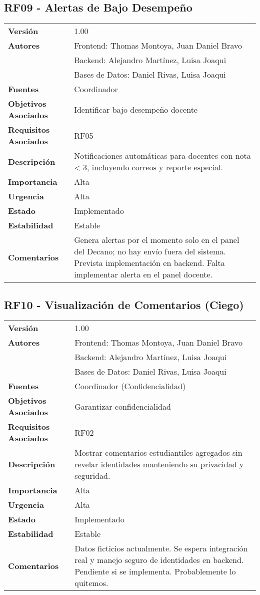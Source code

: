 \documentclass{article}
\begin{document}
\subsection*{RF09 - Alertas de Bajo Desempeño}
\begin{longtable}{>{\bfseries}l p{}}
Versión & 1.00 \\
Autores & Frontend: Thomas Montoya, Juan Daniel Bravo \\ 
        & Backend: Alejandro Martínez, Luisa Joaqui \\ 
        & Bases de Datos: Daniel Rivas, Luisa Joaqui \\
Fuentes & Coordinador \\
Objetivos Asociados & Identificar bajo desempeño docente \\
Requisitos Asociados & RF05 \\
Descripción & Notificaciones automáticas para docentes con nota < 3, incluyendo correos y reporte especial. \\
Importancia & Alta \\
Urgencia & Alta \\
Estado & Implementado \\
Estabilidad & Estable \\
Comentarios & Genera alertas por el momento solo en el panel del Decano; no hay envío fuera del sistema. Prevista implementación en backend. Falta implementar alerta en el panel docente. \\
\end{longtable}

\subsection*{RF10 - Visualización de Comentarios (Ciego)}
\begin{longtable}{>{\bfseries}l p{}}
Versión & 1.00 \\
Autores & Frontend: Thomas Montoya, Juan Daniel Bravo \\ 
        & Backend: Alejandro Martínez, Luisa Joaqui \\ 
        & Bases de Datos: Daniel Rivas, Luisa Joaqui \\
Fuentes & Coordinador (Confidencialidad) \\
Objetivos Asociados & Garantizar confidencialidad \\
Requisitos Asociados & RF02 \\
Descripción & Mostrar comentarios estudiantiles agregados sin revelar identidades manteniendo su privacidad y seguridad. \\
Importancia & Alta \\
Urgencia & Alta \\
Estado & Implementado \\
Estabilidad & Estable \\
Comentarios & Datos ficticios actualmente. Se espera integración real y manejo seguro de identidades en backend. Pendiente si se implementa. Probablemente lo quitemos. \\
\end{longtable}
\end{document}

